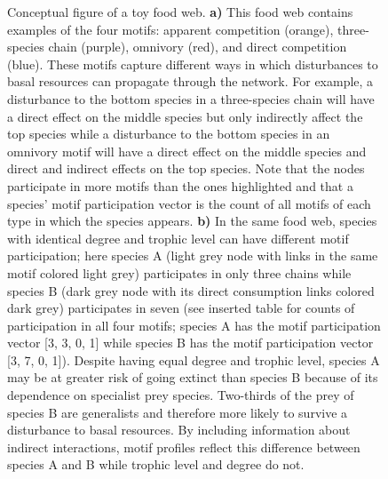 \documentclass[12pt]{article}
\begin{document}
\begin{spacing}{2.0}
        \begin{figure}[hb!]
        \centering
        \caption{Conceptual figure of a toy food web. \textbf{a)} This food web contains examples of the four motifs: apparent competition (orange), three-species chain (purple), omnivory (red), and direct competition (blue). These motifs capture different ways in which disturbances to basal resources can propagate through the network. For example, a disturbance to the bottom species in a three-species chain will have a direct effect on the middle species but only indirectly affect the top species while a disturbance to the bottom species in an omnivory motif will have a direct effect on the middle species and direct and indirect effects on the top species. 
        Note that the nodes participate in more motifs than the ones highlighted and that a species' motif participation vector is the count of all motifs of each type in which the species appears. \textbf{b)} In the same food web, species with identical degree and trophic level can have different motif participation; here species A (light grey node with links in the same motif colored light grey) participates in only three chains while species B (dark grey node with its direct consumption links colored dark grey) participates in seven (see inserted table for counts of participation in all four motifs; species A has the motif participation vector [3, 3, 0, 1] while species B has the motif participation vector [3, 7, 0, 1]).
        Despite having equal degree and trophic level, species A may be at greater risk of going extinct than species B because of its dependence on specialist prey species. Two-thirds of the prey of species B are generalists and therefore more likely to survive a disturbance to basal resources. By including information about indirect interactions, motif profiles reflect this difference between species A and B while trophic level and degree do not.}
    \label{fig:concept}
    \end{figure}



\end{spacing}
\end{document}
